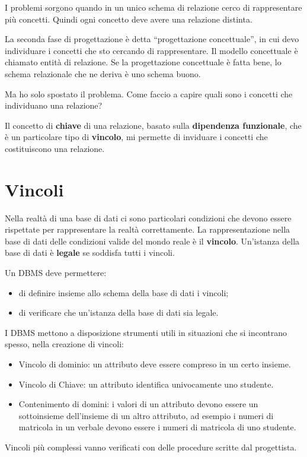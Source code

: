 I problemi sorgono quando in un unico schema di relazione cerco di rappresentare pi\`u concetti. Quindi ogni concetto deve avere una relazione distinta.

La seconda fase di progettazione \`e detta ``progettazione concettuale'', in cui devo individuare i concetti che sto cercando di rappresentare. Il modello concettuale \`e chiamato entit\`a di relazione. Se la progettazione concettuale \`e fatta bene, lo schema relazionale che ne deriva \`e uno schema buono.

Ma ho solo spostato il problema. Come faccio a capire quali sono i concetti che individuano una relazione? 

Il concetto di \textbf{chiave} di una relazione, basato sulla \textbf{dipendenza funzionale}, che \`e un particolare tipo di \textbf{vincolo}, mi permette di inviduare i concetti che costituiscono una relazione.

\section{Vincoli}

Nella realt\`a di una base di dati ci sono particolari condizioni che devono essere rispettate per rappresentare la realt\`a correttamente. La rappresentazione nella base di dati delle condizioni valide del mondo reale \`e il \textbf{vincolo}. Un'istanza della base di dati \`e \textbf{legale} se soddisfa tutti i vincoli.

Un DBMS deve permettere:
\begin{itemize}
    \item di definire insieme allo schema della base di dati i vincoli;
    \item di verificare che un'istanza della base di dati sia legale.
\end{itemize}
I DBMS mettono a disposizione strumenti utili in situazioni che si incontrano spesso, nella creazione di vincoli:
\begin{itemize}
    \item Vincolo di dominio: un attributo deve essere compreso in un certo insieme.
    \item Vincolo di Chiave: un attributo identifica univocamente uno studente.
    \item Contenimento di domini: i valori di un attributo devono essere un sottoinsieme dell'insieme di un altro attributo, ad esempio i numeri di matricola in un verbale devono essere i numeri di matricola di uno studente.
\end{itemize}
Vincoli pi\`u complessi vanno verificati con delle procedure scritte dal progettista.

